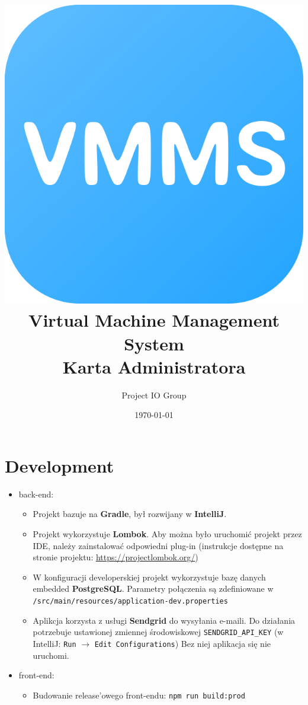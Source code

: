 \documentclass[a4paper]{article}
\title{\includegraphics[width=1 em]{logo} Virtual Machine Management System\\Karta Administratora}  %
\author{Project IO Group}
\date{\today}
\begin{document}
  \maketitle

  \section{Development}
  \begin{itemize}
    \item back-end:
        \begin{itemize}
            \item Projekt bazuje na \textbf{Gradle}, był rozwijany w \textbf{IntelliJ}.
            \item Projekt wykorzystuje \textbf{Lombok}. Aby można było uruchomić projekt przez IDE, należy zainstalować odpowiedni plug-in (instrukcje dostępne na stronie projektu: \url{https://projectlombok.org/})
            \item W konfiguracji developerskiej projekt wykorzystuje bazę danych embedded \textbf{PostgreSQL}. Parametry połączenia są zdefiniowane w \texttt{/src/main/resources/application-dev.properties}
            \item Aplikcja korzysta z usługi \textbf{Sendgrid} do wysyłania e-maili. Do działania potrzebuje ustawionej zmiennej środowiskowej \texttt{SENDGRID\_API\_KEY} (w IntelliJ: \texttt{Run} $\rightarrow$ \texttt{Edit Configurations}) Bez niej aplikacja się nie uruchomi.
        \end{itemize}
    \item front-end:
        \begin{itemize}
            \item Budowanie release'owego front-endu: \texttt{npm run build:prod}
        \end{itemize}
    \end{itemize}
\end{document}
